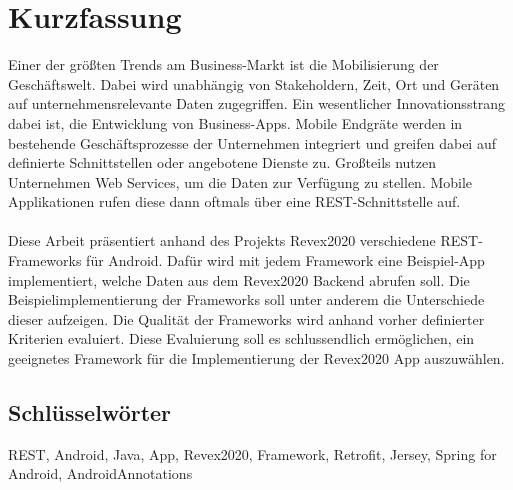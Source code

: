 
\cleardoublepage
{}


\chapter*{Kurzfassung}
Einer der größten Trends am Business-Markt ist die Mobilisierung der Geschäftswelt. Dabei wird unabhängig von Stakeholdern, Zeit, Ort und Geräten auf unternehmensrelevante Daten zugegriffen. Ein wesentlicher Innovationsstrang dabei ist, die Entwicklung von Business-Apps. Mobile Endgräte werden in bestehende Geschäftsprozesse der Unternehmen integriert und greifen dabei auf definierte Schnittstellen oder angebotene Dienste zu. Großteils nutzen Unternehmen Web Services, um die Daten zur Verfügung zu stellen. Mobile Applikationen rufen diese dann oftmals über eine REST-Schnittstelle auf.
\\\\
Diese Arbeit präsentiert anhand des Projekts Revex2020 verschiedene REST-Frameworks für Android. Dafür wird mit jedem Framework eine Beispiel-App implementiert, welche Daten aus dem Revex2020 Backend abrufen soll. Die Beispielimplementierung der Frameworks soll unter anderem die Unterschiede dieser aufzeigen. Die Qualität der Frameworks wird anhand vorher definierter Kriterien evaluiert. Diese Evaluierung soll es schlussendlich ermöglichen, ein geeignetes Framework für die Implementierung der Revex2020 App auszuwählen.

\section*{Schl\"usselw\"orter}
REST, Android, Java, App, Revex2020, Framework, Retrofit, Jersey, Spring for Android, AndroidAnnotations


